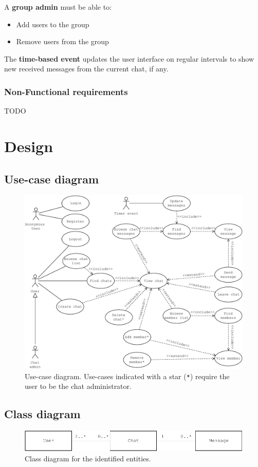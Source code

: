 \documentclass[10pt]{article}
\begin{document}
A \textbf{group admin} must be able to:
\begin{itemize}
    \item Add users to the group
    \item Remove users from the group
\end{itemize}

The \textbf{time-based event} updates the user interface on regular intervals
to show new received messages from the current chat, if any.

\subsubsection{Non-Functional requirements}
TODO

\clearpage
\section{Design}
\subsection{Use-case diagram}
\begin{figure}[h!]
    \centering
    \includegraphics[width=\textwidth]{figs/use_case_diagram}
    \caption{Use-case diagram. Use-cases indicated with a star (\texttt{*})
        require the user to be the chat administrator.}
    \label{fig:usecase}
\end{figure}

\subsection{Class diagram}
\begin{figure}[h!]
    \centering
    \includegraphics[width=\textwidth]{figs/class_diagram}
    \caption{Class diagram for the identified entities.}
    \label{fig:class_diagram}
\end{figure}
\end{document}
